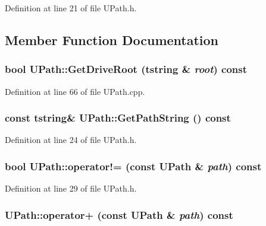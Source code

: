 Definition at line 21 of file UPath.h.

\subsection{Member Function Documentation}
\hypertarget{class_u_path_62269e2268224f6a81c28ab0a296530a}{
\subsubsection[{GetDriveRoot}]{\setlength{\rightskip}{0pt plus 5cm}bool UPath::GetDriveRoot ({\bf tstring} \& {\em root}) const}}
\label{class_u_path_62269e2268224f6a81c28ab0a296530a}




Definition at line 66 of file UPath.cpp.\hypertarget{class_u_path_970648bc09145c6da1712022d84ad3b7}{
\subsubsection[{GetPathString}]{\setlength{\rightskip}{0pt plus 5cm}const {\bf tstring}\& UPath::GetPathString () const}}
\label{class_u_path_970648bc09145c6da1712022d84ad3b7}




Definition at line 24 of file UPath.h.\hypertarget{class_u_path_cf7b322fa5654166f9d9dd7fd87a26f3}{
\subsubsection[{operator!=}]{\setlength{\rightskip}{0pt plus 5cm}bool UPath::operator!= (const {\bf UPath} \& {\em path}) const}}
\label{class_u_path_cf7b322fa5654166f9d9dd7fd87a26f3}




Definition at line 29 of file UPath.h.\hypertarget{class_u_path_95727350cec441edb157e9e7a0faaf46}{
\subsubsection[{operator+}]{ UPath::operator+ (const {\bf UPath} \& {\em path}) const}}
\label{class_u_path_95727350cec441edb157e9e7a0faaf46}




